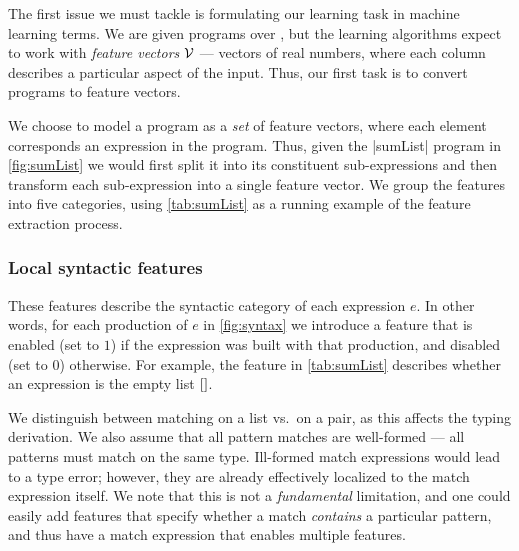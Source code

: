 

The first issue we must tackle is formulating our learning task in
machine learning terms.
%
We are given programs over \lang, but the learning algorithms expect to work
with \emph{feature vectors} $\mathcal{V}$ --- vectors of real numbers, where each
column describes a particular aspect of the input.
%
Thus, our first task is to convert programs to feature vectors.

We choose to model a program as a \emph{set} of feature vectors, where
each element corresponds an expression in the program.
%
Thus, given the |sumList| program in \autoref{fig:sumList} we
would first split it into its constituent sub-expressions and then
transform each sub-expression into a single feature vector.
%
We group the features into five categories, using \autoref{tab:sumList}
as a running example of the feature extraction process.

\subsubsection{Local syntactic features}
These features describe the syntactic category of each expression $e$.
%
In other words, for each production of $e$ in \autoref{fig:syntax} we
introduce a feature that is enabled (set to $1$) if the expression was
built with that production, and disabled (set to $0$) otherwise.
%
For example, the \IsNil feature in \autoref{tab:sumList} describes
whether an expression is the empty list $\mathtt{[]}$.

We distinguish between matching on a list vs.\ on a pair, as this
affects the typing derivation.
%
We also assume that all pattern matches are well-formed --- \ie all
patterns must match on the same type.
%
Ill-formed match expressions would lead to a type error; however, they
are already effectively localized to the match expression itself.
%
We note that this is not a \emph{fundamental} limitation, and one could
easily add features that specify whether a match \emph{contains} a
particular pattern, and thus have a match expression that enables multiple
features.

